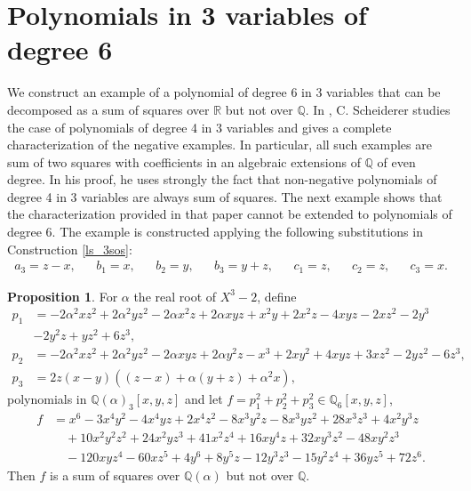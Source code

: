 \documentclass[a4paper,11pt]{amsart}%
\newcommand\Q{\mathbb{Q}}
\newcommand\R{\mathbb{R}}
\theoremstyle{definition}
\newtheorem{prop}[theorem]{Proposition}
\begin{document}
\section{Polynomials in 3 variables of degree 6}
We construct an example of a polynomial of degree 6 in 3 variables that can be decomposed as a sum of squares over $\R$ but not over $\Q$.  In \cite{scheiderer}, C. Scheiderer studies the case of polynomials of degree 4 in 3 variables and gives a complete characterization of the
negative examples. In particular, all such examples are sum of two squares
with coefficients in an algebraic extensions of $\Q$ of even degree. In his proof, he uses strongly the fact that non-negative polynomials of degree 4 in 3 variables are always sum of squares.
The next example shows that the characterization provided in that paper cannot be extended to polynomials of degree 6. The example is constructed applying the following substitutions in Construction \ref{ls_3sos}:
\begin{align*}
  a_3 = z-x, && b_1 = x, && b_2 = y, && b_3 = y+z, && c_1 = z, && c_2 = z, && c_3 = x.
\end{align*}

\begin{prop}\label{3-6_nonQ} %
For $\alpha$ the real root of $X^3-2$, define
{\footnotesize \begin{align*}
p_1 &=-2\alpha^2xz^2+2\alpha^2yz^2-2\alpha x^2z+2\alpha xyz+x^2y+2x^2z-4xyz-2xz^2-2y^3\\
&-2y^2z+yz^2+6z^3, \\
p_2 &= -2\alpha^2xz^2+2\alpha^2yz^2-2\alpha xyz+2\alpha y^2z-x^3+2xy^2+4xyz+3xz^2-2yz^2-6z^3,\\
p_3 &= 2z(x-y)((z-x) + \alpha (y+z) + \alpha^2 x),
\end{align*}}%
polynomials in $\Q(\alpha)_3[x, y, z]$ and let $f = p_1^2 + p_2^2 + p_3^2 \in \Q_6[x,y,z]$,
\begin{align*}
f&=x^6-3x^4y^2-4x^4yz+2x^4z^2-8x^3y^2z-8x^3yz^2+28x^3z^3+4x^2y^3z\\
&\quad+10x^2y^2z^2+24x^2yz^3+41x^2z^4+16xy^4z+32xy^3z^2-48xy^2z^3\\
&\quad-120xyz^4-60xz^5+4y^6+8y^5z-12y^3z^3-15y^2z^4+36yz^5+72z^6.
\end{align*}
Then $f$ is a sum of squares over $\Q(\alpha)$ but not over $\Q$.
\end{prop}
\end{document}
